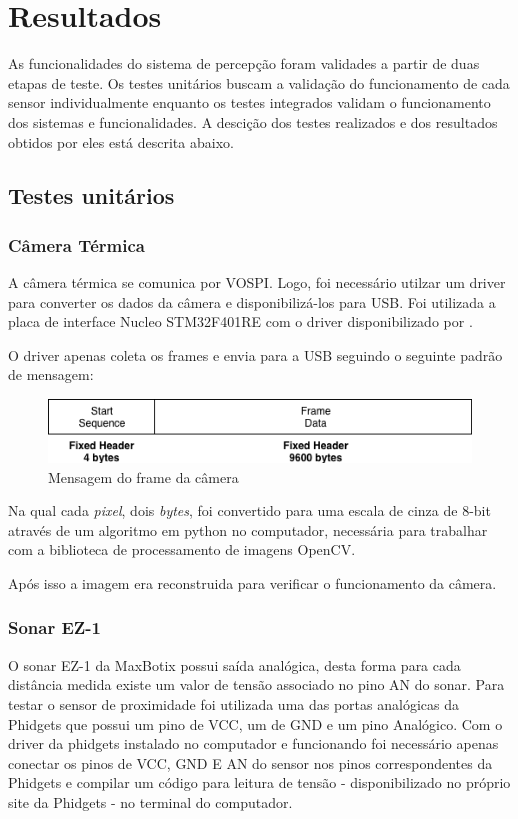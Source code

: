 \chapter{Resultados}
\label{chap:result}

As funcionalidades do sistema de percepção foram validades a partir de duas etapas de teste. Os testes unitários buscam a validação do funcionamento de cada sensor individualmente enquanto os testes integrados validam o funcionamento dos sistemas e funcionalidades. A descição dos testes realizados e dos resultados obtidos por eles está descrita abaixo.

\section{Testes unitários}
\label{sec:testu}

    \subsection{Câmera Térmica}
    
    A câmera térmica se comunica por VOSPI. Logo, foi necessário utilzar um driver para converter os dados da câmera e disponibilizá-los para USB. Foi utilizada a placa de interface Nucleo STM32F401RE com o driver disponibilizado por . 
    
    O driver apenas coleta os frames e envia para a USB seguindo o seguinte padrão de mensagem:
    
    \begin{figure}[!ht]
    	\centering
    	\includegraphics[width=14cm]{Figures/frame_msg.png}
    	\caption{Mensagem do frame da câmera} \label{framemsg}
	\end{figure}
    
    Na qual cada \textit{pixel}, dois \textit{bytes}, foi convertido para uma escala de cinza de 8-bit através de um algoritmo em python no computador, necessária para trabalhar com a biblioteca de processamento de imagens OpenCV.
    
    Após isso a imagem era reconstruida para verificar o funcionamento da câmera.
    
    \subsection{Sonar EZ-1}
    O sonar EZ-1 da MaxBotix possui saída analógica, desta forma para cada distância medida existe um valor de tensão associado no pino AN do sonar. Para testar o sensor de proximidade foi utilizada uma das portas analógicas da Phidgets que possui um pino de VCC, um de GND e um pino Analógico. Com o driver da phidgets instalado no computador e funcionando foi necessário apenas conectar os pinos de VCC, GND E AN do sensor nos pinos correspondentes da Phidgets e compilar um código para leitura de tensão - disponibilizado no próprio site da Phidgets - no terminal do computador. 
    
